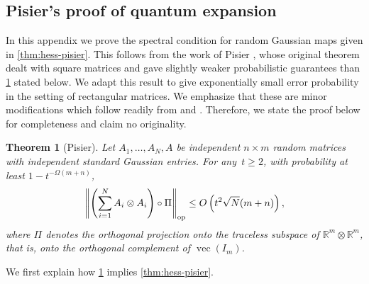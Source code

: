 \documentclass[aos]{imsart}
\newtheorem{theorem}{Theorem}[section]
\theoremstyle{definition}
\numberwithin{equation}{section}
\DeclareMathOperator{\op}{op}
\DeclareMathOperator{\vect}{vec}
\DeclarePairedDelimiter{\norm}{\lVert}{\rVert}
\newcommand{\R}{{\mathbb{R}}}
\newcommand{\ot}{\otimes}
\begin{document}
\begin{appendix}

\section{Pisier's proof of quantum expansion}\label{sec:pisier}
In this appendix we prove the spectral condition for random Gaussian maps given in \cref{thm:hess-pisier}. 
This follows from the work of Pisier \cite{pisier2012grothendieck}, whose original theorem dealt with square matrices and gave slightly weaker probabilistic guarantees than \cref{thm:Pisier-expansion} stated below. We adapt this result to give exponentially small error probability in the setting of rectangular matrices. We emphasize that these are minor modifications which follow readily from \cite{P14} and \cite{pisier2012grothendieck}. Therefore, we state the proof below for completeness and claim no originality. 

\begin{theorem}[Pisier]\label{thm:Pisier-expansion}
Let $A_1,\dots,A_N,A$ be independent $n \times m$ random matrices with independent standard Gaussian entries.
For any~$t \geq 2$, with probability at least $1 - t^{-\Omega(m+n)}$,
\begin{align*}
  \norm*{\left(\sum_{i=1}^N A_i \otimes A_i \right) \circ \Pi}_{\op}
  \leq O\left( t^2 \sqrt{N} ( m+n ) \right),
\end{align*}
where $\Pi$ denotes the orthogonal projection onto the traceless subspace of $\R^m \ot \R^m$, that is, onto the orthogonal complement of $\vect(I_m)$.
\end{theorem}

We first explain how \cref{thm:Pisier-expansion} implies \cref{thm:hess-pisier}.


\end{appendix}
\end{document}
